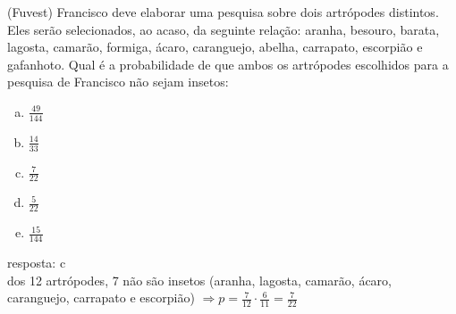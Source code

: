 \begin{ex}
  (Fuvest) Francisco deve elaborar uma pesquisa sobre dois artrópodes distintos. Eles serão selecionados, ao acaso, da seguinte relação: aranha, besouro, barata, lagosta, camarão, formiga, ácaro, caranguejo, abelha, carrapato, escorpião e gafanhoto. Qual é a probabilidade de que ambos os artrópodes escolhidos para a pesquisa de Francisco não sejam insetos:
    \begin{enumerate} [(a)]
        \item $\frac{49}{144}$
        \item $\frac{14}{33}$
        \item $\frac{7}{22}$
        \item $\frac{5}{22}$
        \item $\frac{15}{144}$
    \end{enumerate}
      \begin{sol}
       resposta: c \\
       dos 12 artrópodes, 7 não são insetos (aranha, lagosta, camarão, ácaro, caranguejo, carrapato e escorpião) $\Longrightarrow p= \frac{7}{12}\cdot\frac{6}{11}=\frac{7}{22}$
      \end{sol}
 \end{ex}